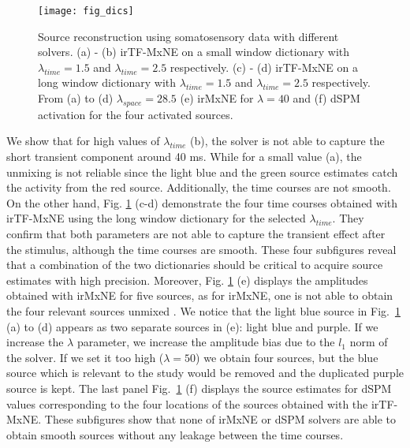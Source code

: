 \begin{figure}
\centering
	\texttt{[image: fig\_dics]}
    \caption{Source reconstruction using somatosensory data with different solvers. (a) - (b) irTF-MxNE on a small window dictionary with $\lambda_{time}=1.5$ and $\lambda_{time}=2.5$ respectively. (c) - (d) irTF-MxNE on a long window dictionary with $\lambda_{time}=1.5$ and $\lambda_{time}=2.5$ respectively. From (a) to (d) $\lambda_{space}=28.5$ (e) irMxNE for $\lambda=40$ and (f) dSPM activation for the four activated sources.}
    \label{fig:MEG_dics}
\end{figure}
We show that for high values of $\lambda_{time}$ (b), the solver is not able to capture the short transient component around 40 ms. While for a small value (a), the unmixing is not reliable since the light blue and the green source estimates catch the activity from the red source. Additionally, the time courses are not smooth. On the other hand, Fig. \ref{fig:MEG_dics} (c-d) demonstrate the four time courses obtained with irTF-MxNE using the long window dictionary for the selected $\lambda_{time}$. They confirm that both parameters are not able to capture the transient effect after the stimulus, although the time courses are smooth. These four subfigures reveal that a combination of the two dictionaries should be critical to acquire source estimates with high precision.
Moreover, Fig. \ref{fig:MEG_dics} (e) displays the amplitudes obtained with irMxNE for five sources, as for irMxNE, one is not able to obtain the four relevant sources unmixed \cite{gramfort2012mixed}. We notice that the light blue source in Fig.~\ref{fig:MEG_dics} (a) to (d) appears as two separate sources in (e): light blue and purple. If we increase the $\lambda$ parameter, we increase the amplitude bias due to the $l_1$ norm of the solver. If we set it too high ($\lambda=50$) we obtain four sources, but the blue source which is relevant to the study would be removed and the duplicated purple source is kept. The last panel Fig.~\ref{fig:MEG_dics} (f) displays the source estimates for dSPM values corresponding to the four locations of the sources obtained with the irTF-MxNE. These subfigures show that none of irMxNE or dSPM solvers are able to obtain smooth sources without any leakage between the time courses.

